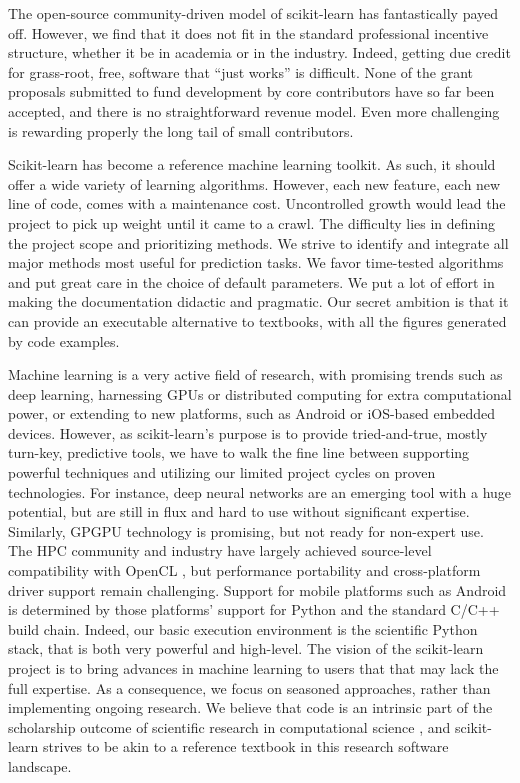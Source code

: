 \documentclass[a4paper]{article}
\begin{document}
The open-source community-driven model of scikit-learn has fantastically
payed off. However, we find that it does not fit in the standard
professional incentive structure, whether it be in academia or in the
industry. Indeed, getting due credit for grass-root, free, software that
``just works'' is difficult. None of the grant proposals submitted to fund
development by core contributors have so far been accepted, and there is
no straightforward revenue model. Even more challenging is rewarding
properly the long tail of small contributors.

Scikit-learn has become a reference machine learning toolkit. As such, it
should offer a wide variety of learning algorithms. However, each new
feature, each new line of code, comes with a maintenance cost.
Uncontrolled growth would lead the project to pick up weight until it
came to a crawl. The difficulty lies in defining the project scope and
prioritizing methods. We strive to identify and integrate all major
methods most useful for prediction tasks. We favor time-tested
algorithms and put great care in the choice of default parameters. We put
a lot of effort in making the documentation didactic and
pragmatic. Our
secret ambition is that it can provide an executable alternative to
textbooks, with all the figures generated by code examples.

Machine learning is a very active field of research, with promising
trends such as deep learning, harnessing GPUs or distributed computing
for extra computational power, or extending to new platforms, such as
Android or iOS-based embedded devices. However, as scikit-learn's purpose
is to provide tried-and-true, mostly turn-key, predictive tools, we have
to walk the fine line between supporting powerful techniques and
utilizing our limited project cycles on proven technologies. For
instance, deep neural networks are an emerging tool with a huge
potential, but are still in flux and hard to use without significant expertise.
Similarly, GPGPU technology is promising, but not ready for non-expert use.
The HPC community and industry have largely achieved source-level compatibility with OpenCL
\cite{stone2010opencl},
but performance portability and cross-platform driver support remain
challenging.
%
Support for mobile platforms such as Android is determined by those platforms'
support for Python and the standard C/C++ build chain. Indeed, our basic
execution environment is the scientific Python stack, that is both very
powerful and high-level. The vision of the scikit-learn project is to
bring advances in machine learning to users that that may lack the full
expertise. As a consequence, we focus on seasoned approaches, rather than
implementing ongoing research. We believe that code is an intrinsic part
of the scholarship outcome of scientific research in computational
science \cite{buckheit1995wavelab}, and scikit-learn strives to be akin
to a reference textbook in this research software landscape.
\end{document}
